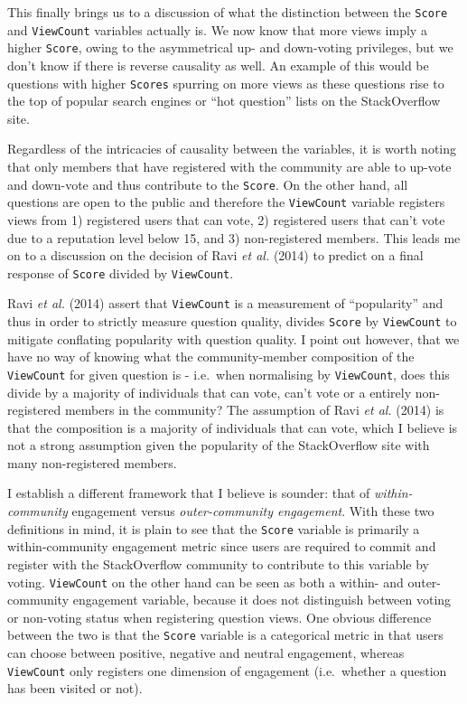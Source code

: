 \documentclass[11pt,preprint, authoryear]{article}
\begin{document}
\normalsize

This finally brings us to a discussion of what the distinction between
the \texttt{Score} and \texttt{ViewCount} variables actually is. We now
know that more views imply a higher \texttt{Score}, owing to the
asymmetrical up- and down-voting privileges, but we don't know if there
is reverse causality as well. An example of this would be questions with
higher \texttt{Scores} spurring on more views as these questions rise to
the top of popular search engines or ``hot question'' lists on the
StackOverflow site.

Regardless of the intricacies of causality between the variables, it is
worth noting that only members that have registered with the community
are able to up-vote and down-vote and thus contribute to the
\texttt{Score}. On the other hand, all questions are open to the public
and therefore the \texttt{ViewCount} variable registers views from 1)
registered users that can vote, 2) registered users that can't vote due
to a reputation level below 15, and 3) non-registered members. This
leads me on to a discussion on the decision of Ravi \emph{et al.} (2014)
to predict on a final response of \texttt{Score} divided by
\texttt{ViewCount}.

Ravi \emph{et al.} (2014) assert that \texttt{ViewCount} is a
measurement of ``popularity'' and thus in order to strictly measure
question quality, divides \texttt{Score} by \texttt{ViewCount} to
mitigate conflating popularity with question quality. I point out
however, that we have no way of knowing what the community-member
composition of the \texttt{ViewCount} for given question is - i.e.~when
normalising by \texttt{ViewCount}, does this divide by a majority of
individuals that can vote, can't vote or a entirely non-registered
members in the community? The assumption of Ravi \emph{et al.} (2014) is
that the composition is a majority of individuals that can vote, which I
believe is not a strong assumption given the popularity of the
StackOverflow site with many non-registered members.

I establish a different framework that I believe is sounder: that of
\emph{within-community} engagement versus \emph{outer-community
engagement}. With these two definitions in mind, it is plain to see that
the \texttt{Score} variable is primarily a within-community engagement
metric since users are required to commit and register with the
StackOverflow community to contribute to this variable by voting.
\texttt{ViewCount} on the other hand can be seen as both a within- and
outer- community engagement variable, because it does not distinguish
between voting or non-voting status when registering question views. One
obvious difference between the two is that the \texttt{Score} variable
is a categorical metric in that users can choose between positive,
negative and neutral engagement, whereas \texttt{ViewCount} only
registers one dimension of engagement (i.e.~whether a question has been
visited or not).
\end{document}
